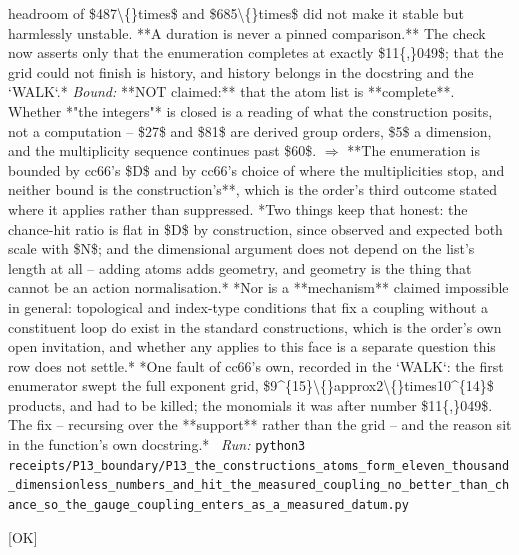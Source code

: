 \begin{description}
headroom of \$487\textbackslash\{\}times\$ and \$685\textbackslash\{\}times\$ did not make it stable but harmlessly unstable. **A duration is never a pinned comparison.** The check now asserts only that the enumeration completes at exactly \$11\{,\}049\$; that the grid could not finish is history, and history belongs in the docstring and the `WALK`.*
 \emph{Bound:} **NOT claimed:** that the atom list is **complete**. Whether *"the integers"* is closed is a reading of what the construction posits, not a computation -- \$27\$ and \$81\$ are derived group orders, \$5\$ a dimension, and the multiplicity sequence continues past \$60\$. \ensuremath{\Rightarrow} **The enumeration is bounded by cc66's \$D\$ and by cc66's choice of where the multiplicities stop, and neither bound is the construction's**, which is the order's third outcome stated where it applies rather than suppressed.  *Two things keep that honest: the chance-hit ratio is flat in \$D\$ by construction, since observed and expected both scale with \$N\$; and the dimensional argument does not depend on the list's length at all -- adding atoms adds geometry, and geometry is the thing that cannot be an action normalisation.*  *Nor is a **mechanism** claimed impossible in general: topological and index-type conditions that fix a coupling without a constituent loop do exist in the standard constructions, which is the order's own open invitation, and whether any applies to this face is a separate question this row does not settle.*  *One fault of cc66's own, recorded in the `WALK`: the first enumerator swept the full exponent grid, \$9\textasciicircum{}\{15\}\textbackslash\{\}approx2\textbackslash\{\}times10\textasciicircum{}\{14\}\$ products, and had to be killed; the monomials it was after number \$11\{,\}049\$. The fix -- recursing over the **support** rather than the grid -- and the reason sit in the function's own docstring.*
\ \emph{Run:} \texttt{python3 receipts/P13\_boundary/P13\_the\_constructions\_atoms\_form\_eleven\_thousand\_dimensionless\_numbers\_and\_hit\_the\_measured\_coupling\_no\_better\_than\_chance\_so\_the\_gauge\_coupling\_enters\_as\_a\_measured\_datum.py}
\item[\label{rcpt:I1_so6C_has_five_real_forms_and_the_omitted_one_admits_su3}\textbf{}\quad\texttt{I1\_so6C\_has\_five\_real\_forms\_and\_the\_omitted\_one\_admits\_su3}]\hfill\textsf{[OK]}\\

\end{description}
